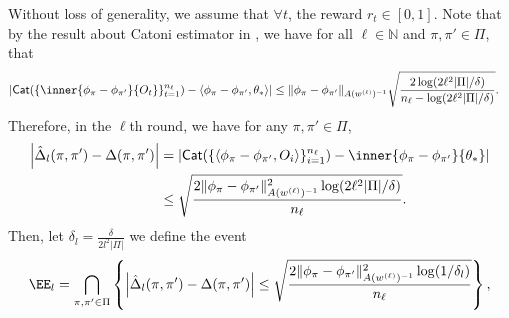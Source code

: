 \documentclass{article}
\newcommand{\1}{\mathbf{1}}
\begin{document}
Without loss of generality, we assume that $\forall t$, the reward $r_t\in[0,1]$. Note that by the result about Catoni estimator in \cite{lugosi2019mean}, we have 
for all $\ell \in \mathbb{N}$ and $\pi,\pi' \in \Pi$, that
\begin{align*}
|{\sf Cat}( \{ \inner{\phi_\pi - \phi_{\pi'}}{O_{t}} \}_{t=1}^{n_\ell}) - \langle \phi_{\pi} - \phi_{\pi'},\theta_* \rangle |
&\leq \| \phi_{\pi} - \phi_{\pi'} \|_{A(w^{(\ell)})^{-1}} \sqrt{ \frac{2 \log(2 \ell^2 |\Pi|/\delta )}{n_\ell - \log(2 \ell^2 |\Pi|/\delta )}}.
\end{align*}
Therefore, in the $\ell$th round, we have for any $\pi,\pi'\in\Pi$,
\begin{align}
    \left|\hat{\Delta}_l(\pi,\pi')-\Delta(\pi,\pi')\right|&=\left|\mathsf{Cat}(\{\langle \phi_{\pi} - \phi_{\pi'}, O_i \rangle\}_{i=1}^{n_{\ell}})-\inner{\phi_\pi-\phi_{\pi'}}{\theta_*}\right|\nonumber\\
    &\leq\sqrt{ \frac{2\| \phi_{\pi} - \phi_{\pi'} \|_{A(w^{(\ell)})^{-1}}^2 \log(2 \ell^2 |\Pi|/\delta )}{n_\ell}}.\label{eqn:11}
\end{align}
Then, let $\delta_l=\frac{\delta}{2l^2|\Pi|}$ we define the event \[\EE_{l}=\bigcap_{\pi,\pi'\in\Pi}\left\{\left|\hat{\Delta}_{l}(\pi,\pi')-\Delta(\pi,\pi')\right|\leq \sqrt{ \frac{2\| \phi_{\pi} - \phi_{\pi'} \|_{A(w^{(\ell)})^{-1}}^2 \log(1/\delta_l )}{n_\ell}}\right\},\]
\end{document}
